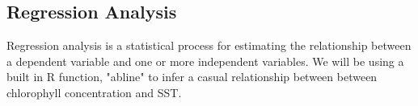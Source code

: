 \subsection{Regression Analysis}

Regression analysis is a statistical process for estimating the relationship between a dependent variable and one or more independent variables. We will be using a built in R function, "abline" to infer a casual relationship between between chlorophyll concentration and SST.